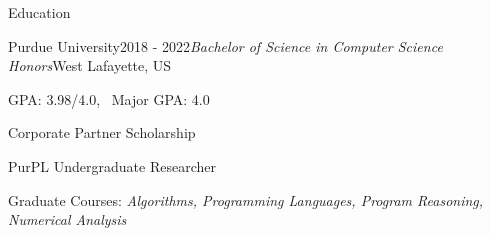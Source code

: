 \documentclass{resume} %
\begin{document}
 


\begin{rSection}{Education}

\begin{rSubsection}{Purdue University}{2018 - 2022}{\textit{Bachelor of Science in Computer Science Honors}}{West Lafayette, US}
\item GPA: 3.98/4.0, \ Major GPA: 4.0
\item Corporate Partner Scholarship
\item PurPL Undergraduate Researcher
\item Graduate Courses: \it Algorithms, Programming Languages,
Program Reasoning, Numerical Analysis
\end{rSubsection}

\end{rSection}

\end{document}
